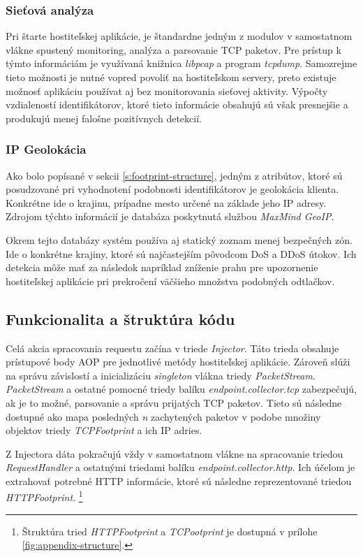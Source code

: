 \documentclass[
  digital, %
  table,   %
  lof,     %
  nolot,   %
  nocover
]{fithesis3}
\begin{document}
\subsubsection{Sieťová analýza}
Pri štarte hostiteľskej aplikácie, je štandardne jedným z modulov v samostatnom
vlákne spustený monitoring, analýza a parsovanie TCP paketov. Pre prístup k
týmto informáciám je využívaná knižnica \textit{libpcap} a program
\textit{tcpdump}. Samozrejme tieto možnosti je nutné vopred povoliť na
hostiteľskom servery, preto existuje možnosť aplikáciu používat aj bez
monitorovania sieťovej aktivity. Výpočty vzdialeností identifikátorov, ktoré
tieto informácie obsahujú sú však presnejšie a produkujú menej falošne
pozitívnych detekcií.

\subsubsection{IP Geolokácia}
Ako bolo popísané v sekcii \ref{s:footprint-structure}, jedným z atribútov, ktoré sú posudzované pri
vyhodnotení podobnosti identifikátorov je geolokácia klienta. Konkrétne ide o
krajinu, prípadne mesto určené na základe jeho IP adresy. Zdrojom týchto
informácií je databáza poskytnutá službou \textit{MaxMind GeoIP}.

Okrem tejto databázy systém používa aj statický zoznam menej bezpečných zón.
Ide o konkrétne krajiny, ktoré sú najčastejším pôvodcom DoS a DDoS útokov. Ich
detekcia môže mať za následok napríklad zníženie prahu pre upozornenie
hostiteľskej aplikácie pri prekročení väčšieho množstva podobných odtlačkov.

\subsection{Funkcionalita a štruktúra kódu}
Celá akcia spracovania requestu začína v triede \textit{Injector}. Táto trieda
obsahuje prístupové body AOP pre jednotlivé metódy hostiteľskej aplikácie.
Zároveň slúži na správu závislostí a inicializáciu \textit{singleton} vlákna
triedy \textit{PacketStream}. \textit{PacketStream} a ostatné pomocné triedy
balíku \textit{endpoint.collector.tcp} zabezpečujú, ak je to možné, parsovanie a 
správu prijatých TCP paketov. Tieto sú následne dostupné ako mapa posledných
\textit{n} zachytených paketov v podobe množiny objektov triedy \textit{TCPFootprint} a ich IP
adries.

Z Injectora dáta pokračujú vždy v samostatnom vlákne na spracovanie triedou
\textit{RequestHandler} a ostatnými triedami balíku
\textit{endpoint.collector.http}. Ich účelom je extrahovať potrebné HTTP
informácie, ktoré sú následne reprezentované triedou \textit{HTTPFootprint}.
\footnote{Štruktúra tried \textit{HTTPFootprint} a \textit{TCPootprint} je dostupná v
prílohe \ref{fig:appendix-structure}.}
\end{document}
